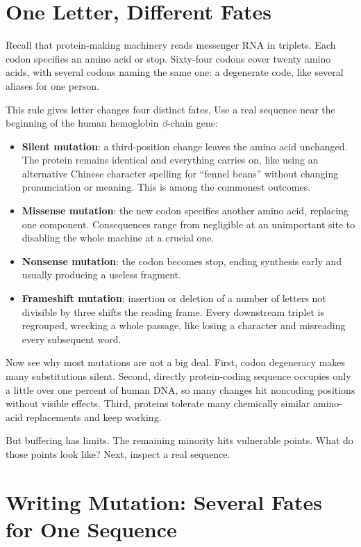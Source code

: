 \section{One Letter, Different Fates}

Recall that protein-making machinery reads messenger RNA in triplets. Each codon specifies an amino acid or stop. Sixty-four codons cover twenty amino acids, with several codons naming the same one: a degenerate code, like several aliases for one person.

This rule gives letter changes four distinct fates. Use a real sequence near the beginning of the human hemoglobin \(\beta\)-chain gene:

\begin{itemize}[itemsep=2pt]
\item \textbf{Silent mutation}: a third-position change leaves the amino acid unchanged. The protein remains identical and everything carries on, like using an alternative Chinese character spelling for ``fennel beans'' without changing pronunciation or meaning. This is among the commonest outcomes.
\item \textbf{Missense mutation}: the new codon specifies another amino acid, replacing one component. Consequences range from negligible at an unimportant site to disabling the whole machine at a crucial one.
\item \textbf{Nonsense mutation}: the codon becomes stop, ending synthesis early and usually producing a useless fragment.
\item \textbf{Frameshift mutation}: insertion or deletion of a number of letters not divisible by three shifts the reading frame. Every downstream triplet is regrouped, wrecking a whole passage, like losing a character and misreading every subsequent word.
\end{itemize}

Now see why most mutations are not a big deal. First, codon degeneracy makes many substitutions silent. Second, directly protein-coding sequence occupies only a little over one percent of human DNA, so many changes hit noncoding positions without visible effects. Third, proteins tolerate many chemically similar amino-acid replacements and keep working.

But buffering has limits. The remaining minority hits vulnerable points. What do those points look like? Next, inspect a real sequence.

\section{Writing Mutation: Several Fates for One Sequence}

